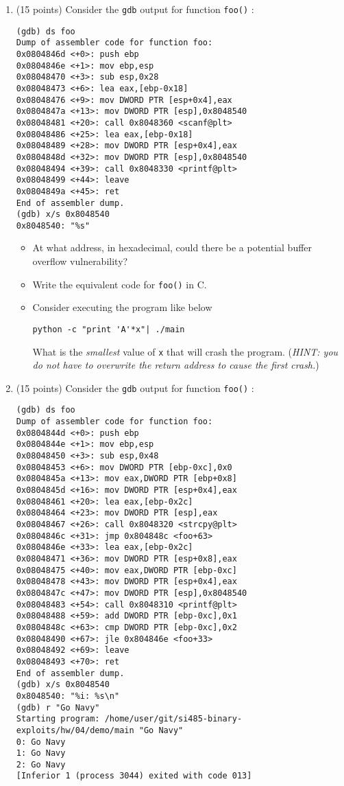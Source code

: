 \documentclass{article}[9pt]
\begin{document}
\begin{enumerate}
\item (15 points) Consider the \texttt{gdb} output for function \texttt{foo()} :

\begin{verbatim}
(gdb) ds foo
Dump of assembler code for function foo:
0x0804846d <+0>: push ebp
0x0804846e <+1>: mov ebp,esp
0x08048470 <+3>: sub esp,0x28
0x08048473 <+6>: lea eax,[ebp-0x18]
0x08048476 <+9>: mov DWORD PTR [esp+0x4],eax
0x0804847a <+13>: mov DWORD PTR [esp],0x8048540
0x08048481 <+20>: call 0x8048360 <scanf@plt>
0x08048486 <+25>: lea eax,[ebp-0x18]
0x08048489 <+28>: mov DWORD PTR [esp+0x4],eax
0x0804848d <+32>: mov DWORD PTR [esp],0x8048540
0x08048494 <+39>: call 0x8048330 <printf@plt>
0x08048499 <+44>: leave
0x0804849a <+45>: ret
End of assembler dump.
(gdb) x/s 0x8048540
0x8048540: "%s"
\end{verbatim}

\begin{itemize}
\item At what address, in hexadecimal, could there be a potential buffer overflow vulnerability?

\item Write the equivalent code for \texttt{foo()} in C.

\item Consider executing the program like below
\begin{verbatim}
python -c "print 'A'*x"| ./main
\end{verbatim}
What is the \emph{smallest} value of \texttt{x} that will crash the
program. (\emph{HINT: you do not have to overwrite the return
address to cause the first crash.})
\end{itemize}

\item (15 points) Consider the \texttt{gdb} output for function \texttt{foo()} :

\begin{verbatim}
(gdb) ds foo
Dump of assembler code for function foo:
0x0804844d <+0>: push ebp
0x0804844e <+1>: mov ebp,esp
0x08048450 <+3>: sub esp,0x48
0x08048453 <+6>: mov DWORD PTR [ebp-0xc],0x0
0x0804845a <+13>: mov eax,DWORD PTR [ebp+0x8]
0x0804845d <+16>: mov DWORD PTR [esp+0x4],eax
0x08048461 <+20>: lea eax,[ebp-0x2c]
0x08048464 <+23>: mov DWORD PTR [esp],eax
0x08048467 <+26>: call 0x8048320 <strcpy@plt>
0x0804846c <+31>: jmp 0x804848c <foo+63>
0x0804846e <+33>: lea eax,[ebp-0x2c]
0x08048471 <+36>: mov DWORD PTR [esp+0x8],eax
0x08048475 <+40>: mov eax,DWORD PTR [ebp-0xc]
0x08048478 <+43>: mov DWORD PTR [esp+0x4],eax
0x0804847c <+47>: mov DWORD PTR [esp],0x8048540
0x08048483 <+54>: call 0x8048310 <printf@plt>
0x08048488 <+59>: add DWORD PTR [ebp-0xc],0x1
0x0804848c <+63>: cmp DWORD PTR [ebp-0xc],0x2
0x08048490 <+67>: jle 0x804846e <foo+33>
0x08048492 <+69>: leave
0x08048493 <+70>: ret
End of assembler dump.
(gdb) x/s 0x8048540
0x8048540: "%i: %s\n"
(gdb) r "Go Navy"
Starting program: /home/user/git/si485-binary-exploits/hw/04/demo/main "Go Navy"
0: Go Navy
1: Go Navy
2: Go Navy
[Inferior 1 (process 3044) exited with code 013]
\end{verbatim}


\end{enumerate}
\end{document}
